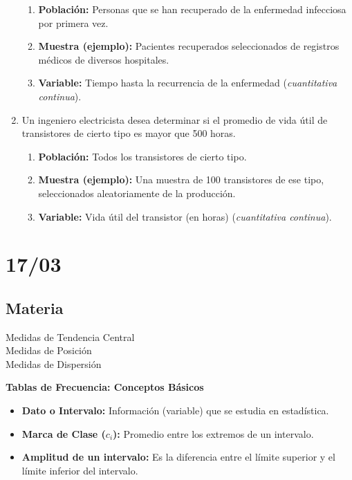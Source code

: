 \documentclass[12pt, letterpaper]{article}
\begin{document}
\begin{enumerate}
        \begin{enumerate}
            \item \textbf{Población:} Personas que se han recuperado de la enfermedad infecciosa por primera vez.
            \item \textbf{Muestra (ejemplo):} Pacientes recuperados seleccionados de registros médicos de diversos hospitales.
            \item \textbf{Variable:} Tiempo hasta la recurrencia de la enfermedad (\textit{cuantitativa continua}).
        \end{enumerate}
    \item Un ingeniero electricista desea determinar si el promedio de vida útil de transistores de cierto tipo es mayor que 500 horas.
        \begin{enumerate}
            \item \textbf{Población:} Todos los transistores de cierto tipo.
            \item \textbf{Muestra (ejemplo):} Una muestra de 100 transistores de ese tipo, seleccionados aleatoriamente de la producción.
            \item \textbf{Variable:} Vida útil del transistor (en horas) (\textit{cuantitativa continua}).
        \end{enumerate}
\end{enumerate}
\newpage

\section{17/03}
\subsection{Materia}
Medidas de Tendencia Central \\
Medidas de Posición \\
Medidas de Dispersión 

\textbf{Tablas de Frecuencia: Conceptos Básicos}
\begin{itemize}
    \item \textbf{Dato o Intervalo:} Información (variable) que se estudia en estadística.
    \item \textbf{Marca de Clase ($c_i$):} Promedio entre los extremos de un intervalo.
    \item \textbf{Amplitud de un intervalo:} Es la diferencia entre el límite superior y el límite inferior del intervalo.
\end{itemize}
\end{document}
